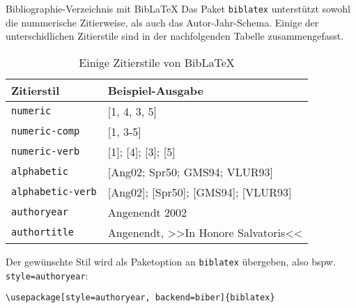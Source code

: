 \begin{frame}[fragile]{Bibliographie-Verzeichnis mit Bib\LaTeX}
Das Paket \texttt{biblatex} unterstützt sowohl die nummerische Zitierweise, als auch das Autor-Jahr-Schema. Einige der unterschidlichen Zitierstile sind in der nachfolgenden Tabelle zusammengefasst. 
\begin{table}
	\caption{Einige Zitierstile von Bib\LaTeX}
\begin{tabular}{ll}
	\hline
	Zitierstil & Beispiel-Ausgabe \\
	\hline
	\texttt{numeric} & [1, 4, 3, 5] \\
	\texttt{numeric-comp} & [1, 3-5] \\
	\texttt{numeric-verb} & [1]; [4]; [3]; [5] \\
	\texttt{alphabetic} & [Ang02; Spr50; GMS94; VLUR93] \\
	\texttt{alphabetic-verb} & [Ang02]; [Spr50]; [GMS94]; [VLUR93] \\
	\texttt{authoryear} & Angenendt 2002 \\
	\texttt{authortitle} & Angenendt, >>In Honore Salvatoris<< \\
	\hline
\end{tabular}
\end{table}

Der gewünschte Stil wird als Paketoption an \texttt{biblatex} übergeben, also bspw. \texttt{style=authoryear}:
\begin{lstlisting}[style=tex]
\usepackage[style=authoryear, backend=biber]{biblatex}
\end{lstlisting}
\end{frame}

